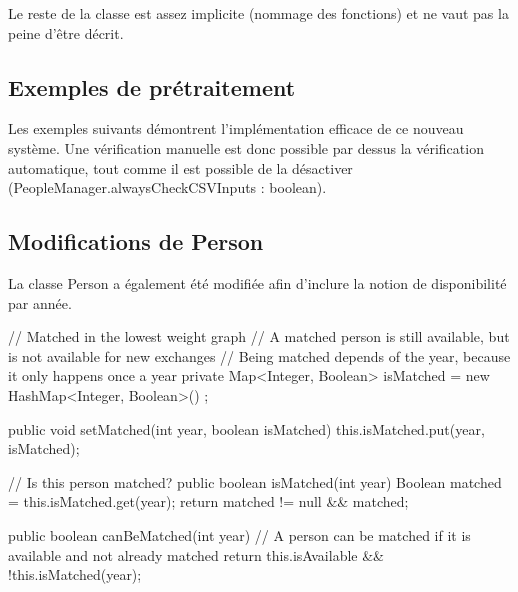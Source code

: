 \documentclass{mytex}
\begin{document}

Le reste de la classe est assez implicite (nommage des fonctions) et ne vaut pas la peine d'être décrit.

\subsection{Exemples de prétraitement}

Les exemples suivants démontrent l'implémentation efficace de ce nouveau système. Une vérification manuelle est donc possible par dessus la vérification automatique, tout comme il est possible de la désactiver (PeopleManager.alwaysCheckCSVInputs : boolean).





\subsection{Modifications de Person}

La classe Person a également été modifiée afin d'inclure la notion de disponibilité par année.

\begin{codebox}
// Matched in the lowest weight graph
// A matched person is still available, but is not available for new exchanges
// Being matched depends of the year, because it only happens once a year
private Map<Integer, Boolean> isMatched = new HashMap<Integer, Boolean>() ;

public void setMatched(int year, boolean isMatched) {
	this.isMatched.put(year, isMatched);
}

// Is this person matched?
public boolean isMatched(int year) {
	Boolean matched = this.isMatched.get(year);
	return matched != null && matched;
}

public boolean canBeMatched(int year) {
	// A person can be matched if it is available and not already matched
	return this.isAvailable && !this.isMatched(year);
}
\end{codebox}
\end{document}
